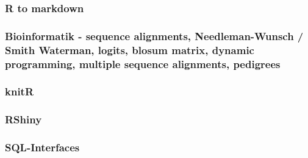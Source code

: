 \documentclass[paper=A4, pagesize, DIV=calc, smallheadings,
fontsize=12pt, expansion=false]{scrreprt}
\begin{document}
\subsubsection{R to markdown}

\subsubsection{Bioinformatik - sequence alignments, Needleman-Wunsch / Smith Waterman, logits, blosum matrix, dynamic 
  programming, multiple sequence alignments, pedigrees}

\subsubsection{knitR}

\subsubsection{RShiny}

\subsubsection{SQL-Interfaces}
\end{document}
